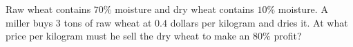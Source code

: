Raw wheat contains $70\%$ moisture and dry wheat contains $10\%$ moisture. A miller buys $3$ tons of raw wheat at $0.4$ dollars per kilogram and dries it. At what price per kilogram must he sell the dry wheat to make an $80\%$ profit?

